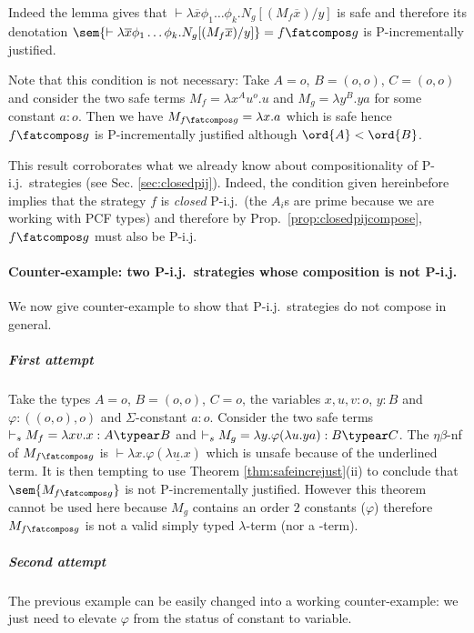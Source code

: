 Indeed the lemma gives that $\vdash \lambda \overline{x} \phi_1
\dots \phi_k. N_g [(M_f \overline{x}) / y]$ is safe and therefore
its denotation $\sem{\vdash \lambda \overline{x} \phi_1 \dots
\phi_k. N_g [(M_f \overline{x}) / y]} = f\fatcompos g$ is
P-incrementally justified.

Note that this condition is not necessary: Take $A=o$, $B=(o,o)$,
$C=(o,o)$ and consider the two safe terms $M_f = \lambda x^A u^o.u$
and $M_g = \lambda y^B . y a$ for  some constant $a:o$. Then we have
$M_{f\fatcompos g} = \lambda x . a$ which is safe hence $f\fatcompos
g$ is P-incrementally justified although $\ord{A} < \ord{B}$.

\begin{remark}
This result corroborates what we already know about compositionality
of P-i.j.\ strategies (see Sec. \ref{sec:closedpij}). Indeed, the
condition given hereinbefore implies that the strategy $f$ is
\emph{closed} P-i.j.\ (the $A_i$s are prime because we are working
with PCF types) and therefore by Prop.\ \ref{prop:closedpijcompose},
$f \fatcompos g$ must also be P-i.j.
\end{remark}




\paragraph{Counter-example: two P-i.j.\ strategies whose composition is not
P-i.j.}

We now give counter-example to show that P-i.j.\ strategies do not
compose in general.

\subparagraph{First attempt}

Take the types $A=o$, $B=(o,o)$, $C=o$, the variables
$x,u,v:o$, $y:B$ and $\varphi:((o,o),o)$ and $\Sigma$-constant $a:o$.
Consider the two safe terms $\vdash_s  M_f = \lambda xv.x : A\typear B$ and $\vdash_s M_g = \lambda y . \varphi (\lambda u . y a) : B\typear C$.
The $\eta\beta$-nf of $M_{f\fatcompos g}$ is $\vdash \lambda x . \varphi (\underline{\lambda u . x})$ which is unsafe because of the underlined term. It is then tempting to use
Theorem \ref{thm:safeincrejust}(ii) to conclude that
$\sem{M_{f\fatcompos g}}$ is not P-incrementally justified. However this theorem cannot be used here because $M_g$ contains an order $2$ constants ($\varphi$) therefore
$M_{f\fatcompos g}$ is not a valid simply typed $\lambda$-term (nor a \pcf-term).

\subparagraph{Second attempt} The previous example can be easily
changed into a working counter-example: we just need to elevate
$\varphi$ from the status of constant to variable.

